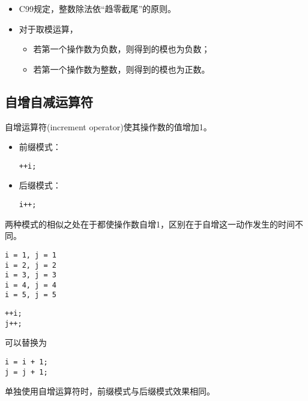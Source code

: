 \begin{frame}[fragile]
\begin{itemize}
\item C99规定，整数除法依“趋零截尾”的原则。\\[0.1in]
\item 对于取模运算，
  \begin{itemize}
  \item 若第一个操作数为负数，则得到的模也为负数；
  \item 若第一个操作数为整数，则得到的模也为正数。
  \end{itemize}
\end{itemize}
\end{frame}

\subsection{自增自减运算符}
\begin{frame}[fragile]
自增运算符(increment operator)使其操作数的值增加1。\vspace{0.1in}

\begin{itemize}
\item 前缀模式：
\begin{lstlisting}[backgroundcolor=\color{red!10}]
++i;
\end{lstlisting} 
\item 后缀模式：
\begin{lstlisting}[backgroundcolor=\color{red!10}]
i++;
\end{lstlisting} 
\end{itemize}
两种模式的相似之处在于都使操作数自增1，区别在于自增这一动作发生的时间不同。
\end{frame}

\begin{frame}[fragile]
  
\end{frame}

\begin{frame}[fragile]  
\begin{lstlisting}[backgroundcolor=\color{red!10}]
i = 1, j = 1
i = 2, j = 2
i = 3, j = 3
i = 4, j = 4
i = 5, j = 5
\end{lstlisting}    
\end{frame}


\begin{frame}[fragile]
\begin{lstlisting}[backgroundcolor=\color{red!10}]
++i;
j++;
\end{lstlisting}
可以替换为
\begin{lstlisting}[backgroundcolor=\color{red!10}]
i = i + 1;
j = j + 1;
\end{lstlisting} \pause 

\textcolor{acolor1}{单独使用自增运算符时，前缀模式与后缀模式效果相同。}
\end{frame}

